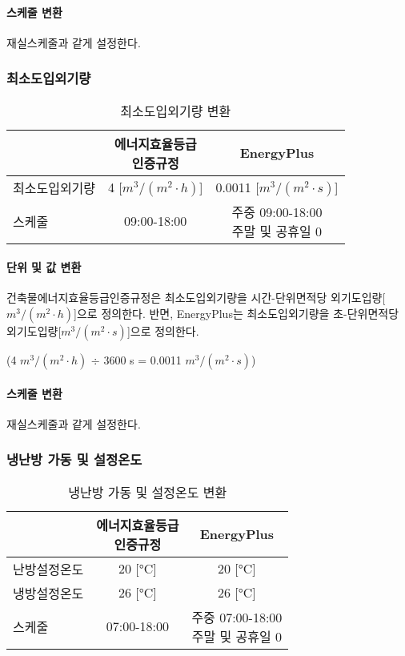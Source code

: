 \paragraph{스케줄 변환} 재실스케줄과 같게 설정한다.



\subsubsection{최소도입외기량}
\begin{table}[ht]
  \caption{최소도입외기량 변환}
  \centering
  \begin{tabular}{lcc}
    \toprule
     & \makecell{에너지효율등급\\인증규정} & EnergyPlus\\ \midrule
    최소도입외기량 &  4 [$m^3/(m^2{\cdot}h)$] & 0.0011 [$m^3/(m^2{\cdot}s)$]  \\ \midrule
    스케줄  &  09:00-18:00      & \makecell{주중 09:00-18:00\\ 주말 및 공휴일 0}  \\ \midrule
  \end{tabular}
\end{table}


\paragraph{단위 및 값 변환} 건축물에너지효율등급인증규정은 최소도입외기량을 시간-단위면적당 외기도입량[$m^3/(m^2{\cdot}h)$]으로 정의한다. 반면, EnergyPlus는 최소도입외기량을 초-단위면적당 외기도입량[$m^3/(m^2{\cdot}s)$]으로 정의한다.\par
  (4 $m^3/(m^2{\cdot}h)$ $\div$ 3600 s = 0.0011 $m^3/(m^2{\cdot}s)$)
\paragraph{스케줄 변환} 재실스케줄과 같게 설정한다.


\subsubsection{냉난방 가동 및 설정온도}
\begin{table}[ht]
  \caption{냉난방 가동 및 설정온도 변환}
  \centering
  \begin{tabular}{lcc}
    \toprule
     & \makecell{에너지효율등급\\인증규정} & EnergyPlus\\ \midrule
    난방설정온도 &  20 [°C] & 20 [°C] \\ \midrule
    냉방설정온도 &  26 [°C] & 26 [°C] \\ \midrule
    스케줄      &  07:00-18:00   & \makecell{주중 07:00-18:00\\ 주말 및 공휴일 0}  \\ \midrule
  \end{tabular}
\end{table}

